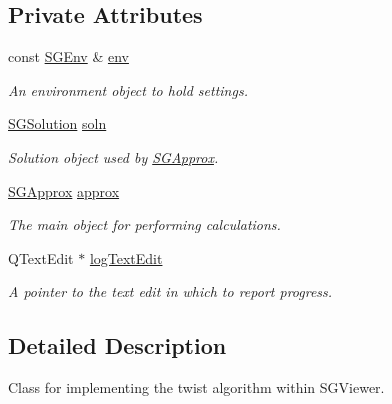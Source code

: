 \subsection*{Private Attributes}
\begin{DoxyCompactItemize}
\item 
\mbox{\label{classSGSolverWorker_a95df48bf9b2675db6130116063fe153f}} 
const \hyperlink{classSGEnv}{S\+G\+Env} \& \hyperlink{classSGSolverWorker_a95df48bf9b2675db6130116063fe153f}{env}
\begin{DoxyCompactList}\small\item\em An environment object to hold settings. \end{DoxyCompactList}\item 
\mbox{\label{classSGSolverWorker_aa505ef292a0745b5ee2a1a372571c1c0}} 
\hyperlink{classSGSolution}{S\+G\+Solution} \hyperlink{classSGSolverWorker_aa505ef292a0745b5ee2a1a372571c1c0}{soln}
\begin{DoxyCompactList}\small\item\em Solution object used by \hyperlink{classSGApprox}{S\+G\+Approx}. \end{DoxyCompactList}\item 
\mbox{\label{classSGSolverWorker_a88eb710c33fce95e9d1dd1f53b5fd694}} 
\hyperlink{classSGApprox}{S\+G\+Approx} \hyperlink{classSGSolverWorker_a88eb710c33fce95e9d1dd1f53b5fd694}{approx}
\begin{DoxyCompactList}\small\item\em The main object for performing calculations. \end{DoxyCompactList}\item 
\mbox{\label{classSGSolverWorker_a4a8878e48bfa5d798eb47b0d7d98aab9}} 
Q\+Text\+Edit $\ast$ \hyperlink{classSGSolverWorker_a4a8878e48bfa5d798eb47b0d7d98aab9}{log\+Text\+Edit}
\begin{DoxyCompactList}\small\item\em A pointer to the text edit in which to report progress. \end{DoxyCompactList}\end{DoxyCompactItemize}


\subsection{Detailed Description}
Class for implementing the twist algorithm within S\+G\+Viewer. 

